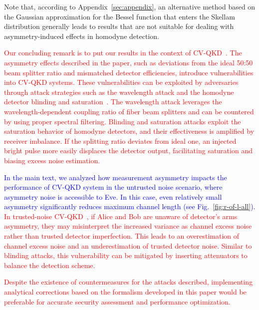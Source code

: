\documentclass[%
reprint,
superscriptaddress,
 amsmath,amssymb,amsfonts,
 aps,
 pra,
 longbibliography
]{revtex4-2}
\begin{document}
Note that, according to Appendix~\ref{sec:appendix},
an alternative method based on the Gaussian approximation
for the Bessel function that enters the Skellam distribution
generally leads to  results that are not suitable for dealing with
asymmetry-induced effects in homodyne detection.

\textcolor{red}{Our concluding remark is to put our results in the context of CV-QKD~\cite{zhang2024continuous}. 
The asymmetry effects described in the paper, such as deviations from the ideal 50:50 beam splitter ratio and mismatched detector efficiencies, introduce vulnerabilities into CV-QKD systems. %
These vulnerabilities can be exploited by adversaries through attack strategies such as the wavelength attack \cite{huang2012wavelength, huang2014quantum} and the homodyne detector blinding \cite{qin2018homodyne} and saturation~\cite{qin2016quantum}. The wavelength attack leverages the wavelength-dependent coupling ratio of fiber beam splitters and can be countered by using proper spectral filtering. Blinding and saturation attacks exploit the saturation behavior of homodyne detectors, and their effectiveness is amplified by receiver imbalance. If the splitting ratio deviates from ideal one, an injected bright pulse more easily displaces the detector output, facilitating saturation and biasing excess noise estimation.} 

\textcolor{blue}{In the main text, we analyzed how measurement asymmetry impacts the performance of CV-QKD system in the untrusted noise scenario, where asymmetry noise is accessible to Eve. In this case, even relatively small asymmetry significantly reduces maximum channel length (see Fig.~\ref{fig:r-of-l-all}).} \textcolor{red}{In trusted-noise CV-QKD~\cite{usenko2016trusted}, if Alice and Bob are unaware of detector’s arms asymmetry, they may misinterpret the increased variance as channel excess noise rather than trusted detector imperfection. This leads to an overestimation of channel excess noise and an underestimation of trusted detector noise. Similar to blinding attacks, this vulnerability can be mitigated by inserting attenuators to balance the detection scheme.}

\textcolor{red}{Despite the existence of countermeasures for the attacks described, implementing analytical corrections based on the formalism developed in this paper would be preferable for accurate security assessment and performance optimization.}
\end{document}
